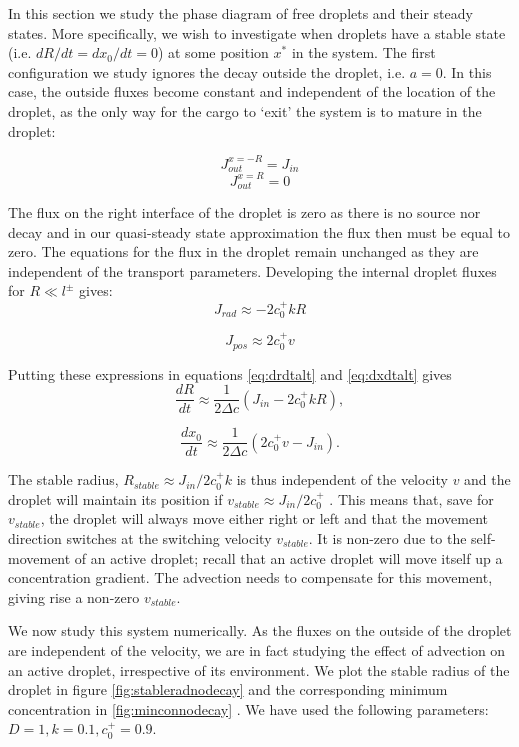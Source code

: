 \documentclass{Dissertate}
\begin{document}
In this section we study the phase diagram of free droplets and their
steady states. More specifically, we wish to investigate when droplets
have a stable state (i.e. \(dR/dt=dx_0/dt=0\)) at some position \(x^*\)
in the system. The first configuration we study ignores the decay
outside the droplet, i.e. \(a=0\). In this case, the outside fluxes
become constant and independent of the location of the droplet, as the
only way for the cargo to `exit' the system is to mature in the droplet:

\[
J_{out}^{x=-R} = J_{in}
\]
\[
J_{out}^{x=R} =0
\]

The flux on the right interface of the droplet is zero as there is no
source nor decay and in our quasi-steady state approximation the flux
then must be equal to zero. The equations for the flux in the droplet remain
unchanged as they are independent of the transport parameters.
Developing the internal droplet fluxes for \(R\ll l^\pm\) gives:
\begin{equation}
J_{rad}\approx -2 c_0^+kR
\label{eq:jrad}\end{equation}

\begin{equation}
J_{pos}\approx2 c_0^+v 
\label{eq:posfluxapprox}\end{equation}

Putting these expressions in equations \ref{eq:drdtalt} and
\ref{eq:dxdtalt} gives \begin{equation}
\frac{dR}{dt} \approx \frac{1}{2\Delta c}(J_{in}-2 c_0^+kR),
\label{eq:drdtapproxnodecay}\end{equation}

\[
\frac{dx_0}{dt} \approx \frac{1}{2\Delta c}(2 c_0^+v-J_{in}).
\]

The stable radius, \(R_{stable} \approx J_{in}/2c_0^+k\) is thus
independent of the velocity \(v\) and the droplet will maintain its
position if \(v_{stable}\approx J_{in}/2c_0^+\) . This means that, save
for \(v_{stable}\), the droplet will always move either right or left
and that the movement direction switches at the switching velocity
\(v_{stable}\). It is non-zero due to the self-movement of an active
droplet; recall that an active droplet will move itself up a
concentration gradient. The advection needs to compensate for this
movement, giving rise a non-zero \(v_{stable}\).

We now study this system numerically. As the fluxes on the outside of
the droplet are independent of the velocity, we are in fact studying the
effect of advection on an active droplet, irrespective of its
environment. We plot the stable radius of the droplet in figure
\ref{fig:stableradnodecay} and the corresponding minimum
concentration in \ref{fig:minconnodecay} . We have used the
following parameters: \(D=1, k=0.1, c_0^+=0.9\).
\end{document}
